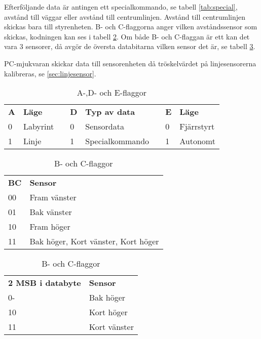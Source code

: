 Efterföljande data är antingen ett specialkommando,
se tabell \ref{tab:special}, avstånd till väggar eller avstånd till 
centrumlinjen.  Avstånd till centrumlinjen skickas bara till styrenheten.
B- och C-flaggorna anger vilken avståndssensor som skickas, kodningen kan ses i
tabell \ref{tab:bcflaggor}. Om både B- och C-flaggan är ett kan det vara 3
sensorer, då avgör de översta databitarna vilken sensor det är, se tabell
\ref{tab:kortsensor}.

PC-mjukvaran skickar data till sensorenheten då tröskelvärdet på linjesensorerna
kalibreras, se \ref{sec:linjesensor}.

\begin{table}[h]
  \centering
  \begin{tabular}{l l l l l l l l}
    \textbf{A} & \textbf{Läge} & & \textbf{D} & \textbf{Typ av data} & & \textbf{E} & \textbf{Läge} \\
    0 & Labyrint & & 0 & Sensordata & & 0 & Fjärrstyrt \\
    1 & Linje & & 1 & Specialkommando & & 1 & Autonomt \\
  \end{tabular}
  \caption{A-,D- och E-flaggor}
  \label{tab:adeflaggor}
\end{table}


\begin{table}[h]
  \centering
  \begin{tabular}{l l}
    \textbf{BC} & \textbf{Sensor} \\
    00 & Fram vänster \\
    01 & Bak vänster \\
    10 & Fram höger\\
    11 & Bak höger, Kort vänster, Kort höger\\
  \end{tabular}
  \caption{B- och C-flaggor}
  \label{tab:bcflaggor}
\end{table}


\begin{table}[h]
  \centering
  \begin{tabular}{l l}
    \textbf{2 MSB i databyte} & \textbf{Sensor} \\
    0- & Bak höger \\
    10 & Kort höger \\
    11 & Kort vänster\\
  \end{tabular}
  \caption{B- och C-flaggor}
  \label{tab:kortsensor}
\end{table}

